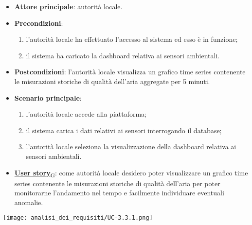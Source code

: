 \begin{itemize}
	\item \textbf{Attore principale}: autorità locale.
	\item \textbf{Precondizioni}:
	      \begin{enumerate}
		      \item l'autorità locale ha effettuato l'accesso al sistema ed esso è in funzione;
		      \item il sistema ha caricato la dashboard relativa ai sensori ambientali.
	      \end{enumerate}
	\item \textbf{Postcondizioni}: l'autorità locale visualizza un grafico time series contenente le misurazioni storiche
	      di qualità dell'aria aggregate per 5 minuti.
	\item \textbf{Scenario principale}:
	      \begin{enumerate}
		      \item l'autorità locale accede alla piattaforma;
		      \item il sistema carica i dati relativi ai sensori interrogando il database;
		      \item l'autorità locale seleziona la visualizzazione della dashboard relativa ai sensori ambientali.
	      \end{enumerate}
	\item \href{https://7last.github.io/docs/pb/documentazione-interna/glossario\#user-story}{\textbf{User story}\textsubscript{G}}:
	      come autorità locale desidero poter visualizzare un grafico time series contenente le misurazioni storiche
	      di qualità dell'aria per poter monitorarne l'andamento nel tempo e facilmente individuare eventuali anomalie.
\end{itemize}
\begin{center}
	\texttt{[image: analisi\_dei\_requisiti/UC-3.3.1.png]}
\end{center}


